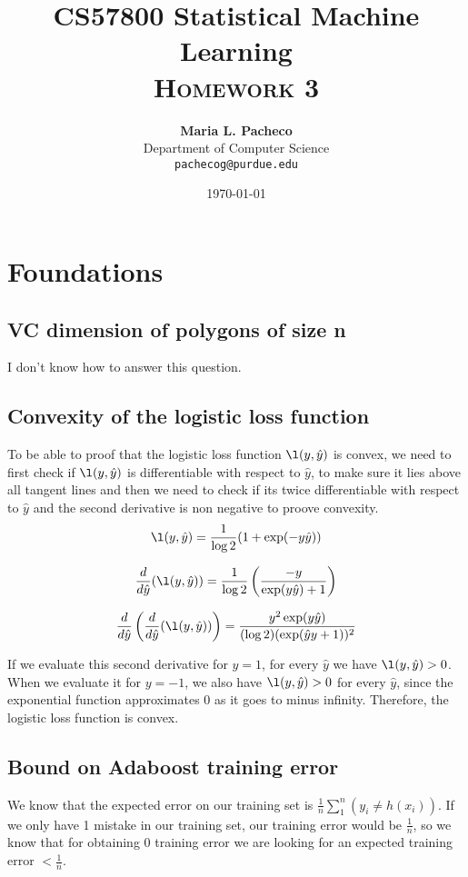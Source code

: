 \documentclass[11pt]{article}
\title{
\textbf{CS57800 Statistical Machine Learning} \\ \textsc{Homework 3} \\
\normalsize\vspace{0.1in}
}
\author{
	\textbf{Maria L. Pacheco} \\
	Department of Computer Science\\
	\texttt{pachecog@purdue.edu}
}
\date{\today}
\begin{document}
\maketitle

\section{Foundations}
\subsection{VC dimension of polygons of size n}
I don't know how to answer this question. 


\subsection{Convexity of the logistic loss function}
To be able to proof that the logistic loss function $\l(y,\hat{y})$ is convex, we need to first check if $\l(y,\hat{y})$ is differentiable with respect to $\hat{y}$, to make sure it lies above all tangent lines and then we need to check if its twice differentiable with respect to $\hat{y}$ and the second derivative is non negative to proove convexity.\\
$$\l(y,\hat{y}) = \frac{1}{\log2} (1 + \exp(-y\hat{y}))$$

$$\frac{d}{d\hat{y}} (\l(y,\hat{y})) = \frac{1}{\log2} \left ( \frac{-y}{\exp(y\hat{y}) + 1}  \right )$$

$$\frac{d}{d\hat{y}} \left( \frac{d}{d\hat{y}} (\l(y,\hat{y})) \right) = \frac{y^{2} \exp(y\hat{y})}{(\log2) (\exp(\hat{y}y + 1))^{2}}$$

If we evaluate this second derivative for $y = 1$,  for every $\hat{y}$ we have $\l(y,\hat{y}) > 0$. When we evaluate it for $y = -1$, we also have $\l(y,\hat{y}) > 0$ for every $\hat{y}$, since the exponential function approximates 0 as it goes to minus infinity. Therefore, the logistic loss function is convex.

\subsection{Bound on Adaboost training error}
We know that the expected error on our training set is $\frac{1}{n} \sum_{1}^{n} (y_{i} \neq h(x_{i}))$. If we only have 1 mistake in our training set, our training error would be $\frac{1}{n}$, so we know that for obtaining 0 training error we are looking for an expected training error $< \frac{1}{n}$.\\
\end{document}
